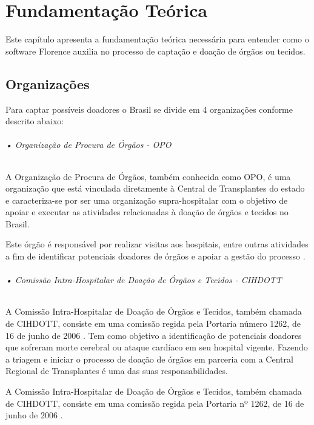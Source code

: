\documentclass[portuguese,oneside]{tcc}
\begin{document}
\chapter{Fundamentação Teórica}
Este capítulo apresenta a fundamentação teórica necessária para entender como o software Florence auxilia no processo de captação e doação de órgãos ou tecidos.

\section{Organizações}
Para captar possíveis doadores o Brasil se divide em 4 organizações conforme descrito abaixo:



\subparagraph{• Organização de Procura de Órgãos - OPO}

A Organização de Procura de Órgãos, também conhecida como OPO, é uma organização que está vinculada diretamente à Central de Transplantes do estado e caracteriza-se por ser uma organização supra-hospitalar com o objetivo de apoiar e executar as atividades relacionadas à doação de órgãos e tecidos no Brasil.

Este órgão é responsável por realizar visitas aos hospitais, entre outras atividades a fim de identificar potenciais doadores de órgãos e apoiar a gestão do processo \cite{HOSPITALSAOLUCAS}.   %

\subparagraph{• Comissão Intra-Hospitalar de Doação de Órgãos e Tecidos - CIHDOTT}

A Comissão Intra-Hospitalar de Doação de Órgãos e Tecidos, também chamada de CIHDOTT, consiste em uma comissão regida pela Portaria número 1262, de 16 de junho de 2006 \cite{HCI}. Tem como objetivo a identificação de potenciais doadores que sofreram morte cerebral ou ataque cardíaco em seu hospital vigente. Fazendo a triagem e iniciar o processo de doação de órgãos em parceria com a Central Regional de Transplantes é uma das suas responsabilidades.

A Comissão Intra-Hospitalar de Doação de Órgãos e Tecidos, também chamada de CIHDOTT, consiste em uma comissão regida pela Portaria nº 1262, de 16 de junho de 2006 \cite{HCI}.
\end{document}
